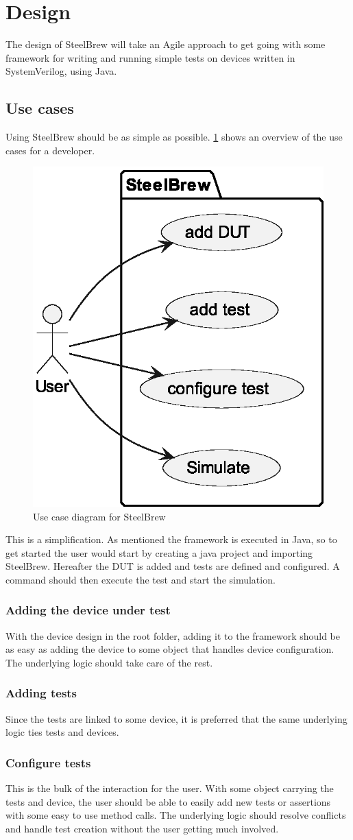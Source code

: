 \section{Design}\label{sec:04}
The design of SteelBrew will take an Agile approach to get going with some framework for writing and running simple tests on devices written in SystemVerilog, using Java.
\subsection{Use cases}
Using SteelBrew should be as simple as possible. \cref{fig:usecases} shows an overview of the use cases for a developer.
\begin{figure}
    \centering
    \caption{Use case diagram for SteelBrew}\label{fig:usecases}
    \includegraphics[width=.3\textwidth]{out/plantuml/usecase/usecase.eps}
\end{figure}
This is a simplification. As mentioned the framework is executed in Java, so to get started the user would start by creating a java project and importing SteelBrew. Hereafter the DUT is added and tests are defined and configured. A command should then execute the test and start the simulation.
\subsubsection{Adding the device under test}
With the device design in the root folder, adding it to the framework should be as easy as adding the device to some object that handles device configuration. The underlying logic should take care of the rest.
\subsubsection{Adding tests}
Since the tests are linked to some device, it is preferred that the same underlying logic ties tests and devices.
\subsubsection{Configure tests}
This is the bulk of the interaction for the user. With some object carrying the tests and device, the user should be able to easily add new tests or assertions with some easy to use method calls. The underlying logic should resolve conflicts and handle test creation without the user getting much involved.
